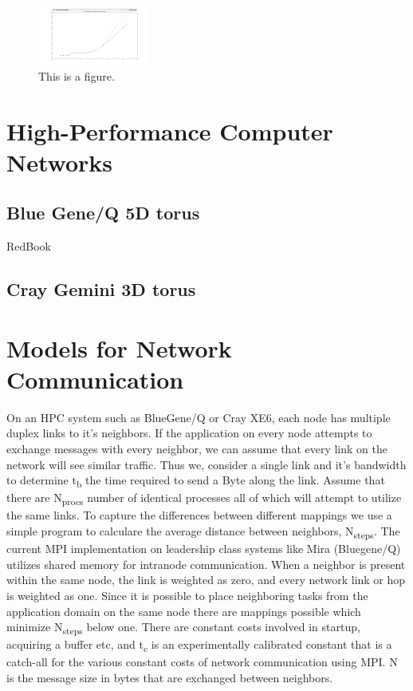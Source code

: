 \documentclass[conference,10pt]{IEEEtran}
\begin{document}
\label{sect:Analytic-model}
\begin{figure}
  \center
  \includegraphics[width=0.325\textwidth]{fig/Analytic_regular_no_congestion_170_304_304.png}
  \caption{This is a figure.
    \label{fig:Analytic_regular_no_congestion_170_304_304.png}}
\end{figure}

\section{High-Performance Computer Networks}

\subsection{Blue Gene/Q 5D torus}
RedBook~\cite{BGQ_RedBook_2013}

\subsection{Cray Gemini 3D torus}

\section{Models for Network Communication}

On an HPC system such as BlueGene/Q or Cray XE6, each node has multiple duplex links to it's neighbors.
If the application on every node attempts to exchange messages with every neighbor, we can assume that
every link on the network will see similar traffic. Thus we, consider a single link and it's bandwidth
to determine t\textsubscript{b} the time required to send a Byte along the link. Assume that there are N\textsubscript{procs} number
of identical processes all of which will attempt to utilize the same links. To capture the differences
between different mappings we use a simple program to calculare the average distance between neighbors,
N\textsubscript{steps}. The current MPI implementation on leadership class systems like Mira (Bluegene/Q) utilizes
shared memory for intranode communication. When a neighbor is present within the same node, the link
is weighted as zero, and every network link or hop is weighted as one. Since it is possible to place
neighboring tasks from the application domain on the same node there are mappings possible which
minimize N\textsubscript{steps} below one. There are constant costs involved in startup, acquiring a buffer etc,
and t\textsubscript{c} is an experimentally calibrated constant that is a catch-all for the various constant costs
of network communication using MPI. N is the message size in bytes that are exchanged between neighbors.
\end{document}
